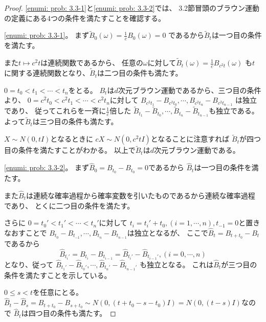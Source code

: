 \documentclass[uplatex]{jsarticle}
\theoremstyle{definition}
\begin{document}
\begin{proof}
  \ref{enumi: prob: 3.3-1}と\ref{enumi: prob: 3.3-2}では、
  3.2節冒頭のブラウン運動の定義にある4つの条件を満たすことを確認する。

  \ref{enumi: prob: 3.3-1}。
  まず\(\tilde{B}_0(\omega) = \frac{1}{c}B_0(\omega) = 0\)
  であるから\(\tilde{B}_t\)は一つ目の条件を満たす。

  また\(t\mapsto c^2t\)は連続関数であるから、
  任意の\(\omega\)に対して\(\tilde{B}_t(\omega) = \frac{1}{c}B_{c^2t}(\omega)\)
  も\(t\)に関する連続関数となり、\(\tilde{B}_t\)は二つ目の条件も満たす。

  \(0 = t_0 < t_1 < \cdots < t_n\)をとる。
  \(B_t\)は\(d\)次元ブラウン運動であるから、三つ目の条件より、
  \(0 = c^2t_0 < c^2t_1 < \cdots < c^2t_n\)に対して
  \(B_{c^2t_1}-B_{c^2t_0},\cdots ,B_{c^2t_n}-B_{c^2t_{n-1}}\)
  は独立であり、
  従ってこれらを一斉に\(\frac{1}{c}\)倍した
  \(\tilde{B}_{t_1}-\tilde{B}_{t_0}, \cdots,
  \tilde{B}_{t_n}-\tilde{B}_{t_{n-1}}\)も独立である。
  よって\(\tilde{B}_t\)は三つ目の条件も満たす。

  \(X\sim N(0,tI)\)となるときに
  \(cX\sim N(0,c^2tI)\)となることに注意すれば
  \(\tilde{B}_t\)が四つ目の条件を満たすことがわかる。
  以上で\(\tilde{B}_t\)は\(d\)次元ブラウン運動である。

  \ref{enumi: prob: 3.3-2}。
  まず\(\hat{B}_0 = B_{t_0}-B_{t_0} = 0\)であるから
  \(\hat{B}_t\)は一つ目の条件を満たす。

  また\(\hat{B}_t\)は連続な確率過程から確率変数を引いたものであるから連続な確率過程であり、
  とくに二つ目の条件を満たす。

  さらに
  \(0=t_0' < t_1' < \cdots < t_n'\)に対して
  \(t_i = t_i' + t_0 , (i=1,\cdots, n),t_{-1}=0\)と置きなおすことで
  \(B_{t_0}-B_{t_{-1}},\cdots,B_{t_n}-B_{t_{n-1}}\)は独立となるが、
  ここで\(\hat{B}_t = B_{t+t_0}-B_t\)であるから
  \[
  \hat{B}_{t_i'}
  = B_{t_i}-B_{t_{i-1}}
  = \hat{B}_{t_i'} - \hat{B}_{t_{i-1}'}, (i=0,\cdots,n)
  \]
  となり、従って
  \(\hat{B}_{t_1'}-\hat{B}_{t_0'}, \cdots, \hat{B}_{t_n'}-\hat{B}_{t_{n-1}'}\)
  も独立となる。
  これは\(\hat{B}_t\)が三つ目の条件を満たすことを示している。

  \(0\leq s < t\)を任意にとる。
  \(\hat{B}_t - \hat{B}_s = B_{t+t_0} - B_{s+t_0} \sim
  N(0,(t+t_0 - s-t_0)I) = N(0,(t-s)I)\)なので
  \(\hat{B}_t\)は四つ目の条件も満たす。


\end{proof}
\end{document}
